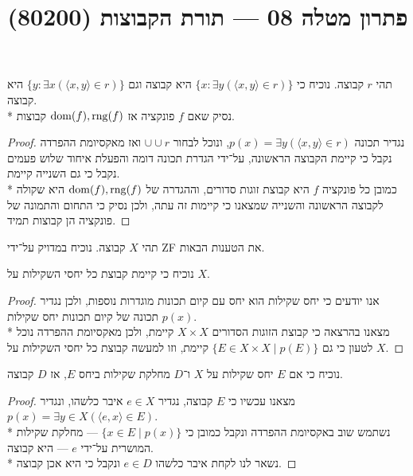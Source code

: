 
\title{פתרון מטלה 08 --- תורת הקבוצות (80200)}

\DeclareMathOperator\dom{dom}
\DeclareMathOperator\add{Add}
\DeclareMathOperator\mult{Mult}

\maketitle
\maketitleprint{}

\Question{}
תהי $r$ קבוצה. נוכיח כי $\{ x : \exists y (\langle x, y \rangle \in r )\}$ היא קבוצה וגם $\{ y : \exists x(\langle x, y \rangle \in r )\}$ היא קבוצה. \\*
נסיק שאם $f$ פונקציה אז $\dom(f), \rng(f)$ קבוצות.
\begin{proof}
	נגדיר תכונה $p(x) = \exists y (\langle x, y \rangle \in r)$, ונוכל לבחור $\cup \cup r$ ואז מאקסיומת ההפרדה נקבל כי קיימת הקבוצה הראשונה, על־ידי הגדרת תכונה דומה והפעלת איחוד שלוש פעמים נקבל כי גם השנייה קיימת. \\*
	כמובן כל פונקציה $f$ היא קבוצת זוגות סדורים, וההגדרה של $\dom(f), \rng(f)$ היא שקולה לקבוצה הראשונה והשנייה שמצאנו כי קיימות זה עתה, ולכן נסיק כי התחום והתמונה של פונקציה הן קבוצות תמיד.
\end{proof}

\Question{}
תהי $X$ קבוצה. נוכיח במדויק על־ידי ZF את הטענות הבאות.

\Subquestion{}
נוכיח כי קיימת קבוצת כל יחסי השקילות על $X$.
\begin{proof}
	אנו יודעים כי יחס שקילות הוא יחס עם קיום תכונות מוגדרות נוספות, ולכן נגדיר $p(x)$ תכונה של קיום תכונות יחס שקילות. \\*
	מצאנו בהרצאה כי קבוצת הזוגות הסדורים $X \times X$ קיימת, ולכן מאקסיומת ההפרדה נוכל לטעון כי גם $\{ E \in X \times X \mid p(E) \}$ קיימת, וזו למעשה קבוצת כל יחסי השקילות על $X$.
\end{proof}

\Subquestion{}
נוכיח כי אם $E$ יחס שקילות על $X$ ו־$D$ מחלקת שקילות ביחס $E$, אז $D$ קבוצה.
\begin{proof}
	מצאנו עכשיו כי $E$ קבוצה, נגדיר $e \in X$ איבר כלשהו, ונגדיר $p(x) = \exists y \in X (\langle e, x \rangle \in E)$. \\*
	נשתמש שוב באקסיומת ההפרדה ונקבל כמובן כי $\{ x \in E \mid p(x) \}$ --- מחלקת שקילות המושרית על־ידי $e$ --- היא קבוצה. \\*
	נשאר לנו לקחת איבר כלשהו $e \in D$ ונקבל כי היא אכן קבוצה.
\end{proof}

